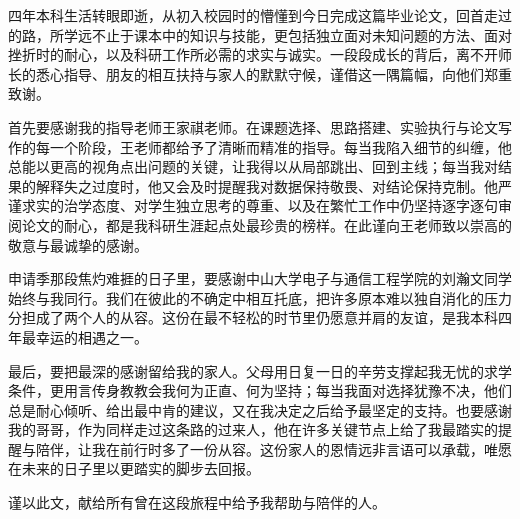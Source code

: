 
\begin{acknowledgements}

    四年本科生活转眼即逝，从初入校园时的懵懂到今日完成这篇毕业论文，回首走过的路，所学远不止于课本中的知识与技能，更包括独立面对未知问题的方法、面对挫折时的耐心，以及科研工作所必需的求实与诚实。一段段成长的背后，离不开师长的悉心指导、朋友的相互扶持与家人的默默守候，谨借这一隅篇幅，向他们郑重致谢。

    首先要感谢我的指导老师王家祺老师。在课题选择、思路搭建、实验执行与论文写作的每一个阶段，王老师都给予了清晰而精准的指导。每当我陷入细节的纠缠，他总能以更高的视角点出问题的关键，让我得以从局部跳出、回到主线；每当我对结果的解释失之过度时，他又会及时提醒我对数据保持敬畏、对结论保持克制。他严谨求实的治学态度、对学生独立思考的尊重、以及在繁忙工作中仍坚持逐字逐句审阅论文的耐心，都是我科研生涯起点处最珍贵的榜样。在此谨向王老师致以崇高的敬意与最诚挚的感谢。

    申请季那段焦灼难捱的日子里，要感谢中山大学电子与通信工程学院的刘瀚文同学始终与我同行。我们在彼此的不确定中相互托底，把许多原本难以独自消化的压力分担成了两个人的从容。这份在最不轻松的时节里仍愿意并肩的友谊，是我本科四年最幸运的相遇之一。

    最后，要把最深的感谢留给我的家人。父母用日复一日的辛劳支撑起我无忧的求学条件，更用言传身教教会我何为正直、何为坚持；每当我面对选择犹豫不决，他们总是耐心倾听、给出最中肯的建议，又在我决定之后给予最坚定的支持。也要感谢我的哥哥，作为同样走过这条路的过来人，他在许多关键节点上给了我最踏实的提醒与陪伴，让我在前行时多了一份从容。这份家人的恩情远非言语可以承载，唯愿在未来的日子里以更踏实的脚步去回报。

    谨以此文，献给所有曾在这段旅程中给予我帮助与陪伴的人。

\end{acknowledgements}
